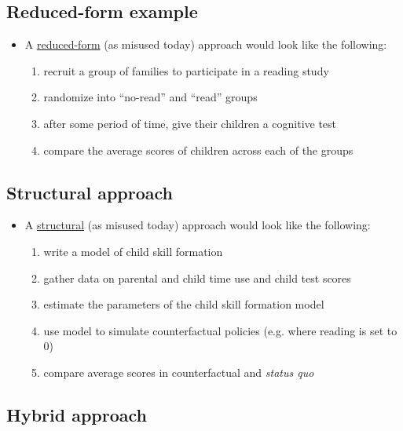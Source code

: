 \documentclass[11pt]{article}
\begin{document}
\subsection{Reduced-form example}
\label{sec:org916145d}

\begin{itemize}
\item A \uline{reduced-form} (as misused today) approach would look like the following:

\begin{enumerate}
\item recruit a group of families to participate in a reading study
\item randomize into ``no-read'' and ``read'' groups
\item after some period of time, give their children a cognitive test
\item compare the average scores of children across each of the groups
\end{enumerate}
\end{itemize}


\subsection{Structural approach}
\label{sec:org35ee967}

\begin{itemize}
\item A \uline{structural} (as misused today) approach would look like the following:

\begin{enumerate}
\item write a model of child skill formation \cite{cunha_al2010}
\item gather data on parental and child time use and child test scores
\item estimate the parameters of the child skill formation model
\item use model to simulate counterfactual policies (e.g. where reading is set to 0)
\item compare average scores in counterfactual and \emph{status quo}
\end{enumerate}
\end{itemize}

\subsection{Hybrid approach}
\label{sec:orgca147c5}
\end{document}
